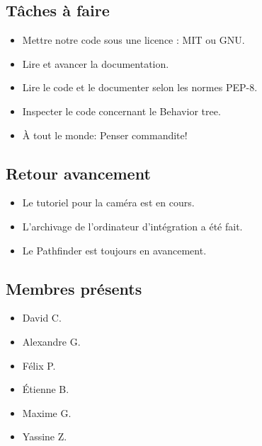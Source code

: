 \documentclass[12pt,letterpaper,twoside]{article}
\begin{document}
\subsection{Tâches à faire}
\begin{itemize}
	\item Mettre notre code sous une licence : MIT ou GNU.
	\item Lire et avancer la documentation.
	\item Lire le code et le documenter selon les normes PEP-8.
	\item Inspecter le code concernant le Behavior tree.
	\item À tout le monde: Penser commandite!
\end{itemize}

\subsection*{Retour avancement}
\begin{itemize}
	\item Le tutoriel pour la caméra est en cours.
	\item L'archivage de l'ordinateur d'intégration a été fait.
	\item Le Pathfinder est toujours en avancement.
\end{itemize}


\subsection*{Membres présents}
\begin{itemize}
\item David C.
\item Alexandre G.
\item Félix P.
\item Étienne B.
\item Maxime G.
\item Yassine Z.
\end{itemize}
\end{document}
